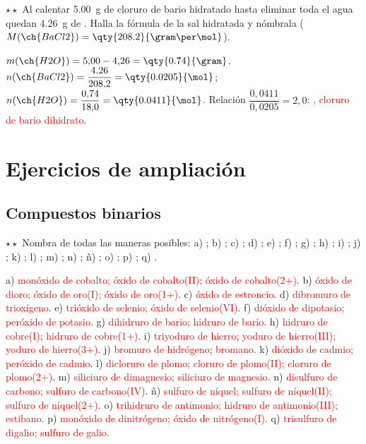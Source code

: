 \begin{exercise}
    \(\star\star\) Al calentar \qty{5.00}{\gram} de cloruro de bario hidratado hasta eliminar toda el agua quedan
    \qty{4.26}{\gram} de . Halla la fórmula de la sal hidratada y nómbrala (\(M(\ch{BaCl2}) = \qty{208.2}{\gram\per\mol}\)).
    \begin{solu}
        \(m(\ch{H2O}) = 5{,}00 - 4{,}26 = \qty{0.74}{\gram}\). \(n(\ch{BaCl2}) = \dfrac{4{,}26}{208{,}2} = \qty{0.0205}{\mol}\);
        \(n(\ch{H2O}) = \dfrac{0{,}74}{18{,}0} = \qty{0.0411}{\mol}\). Relación \(\dfrac{0{,}0411}{0{,}0205} = 2{,}0\):
        \textcolor{red}{, cloruro de bario dihidrato}.
    \end{solu}
\end{exercise}

\section{Ejercicios de ampliación}\label{sec:ud5-ampliacion}

\subsection{Compuestos binarios}

\begin{exercise}
    \(\star\star\) Nombra de todas las maneras posibles: a) ; b) ; c) ; d) ; e) ;
    f) ; g) ; h) ; i) ; j) ; k) ; l) ; m) ; n)
    ; ñ) ; o) ; p) ; q) .
    \begin{solu}
        a) \textcolor{red}{monóxido de cobalto; óxido de cobalto(II); óxido de cobalto(2+)}. b) \textcolor{red}{óxido de dioro;
        óxido de oro(I); óxido de oro(1+)}. c) \textcolor{red}{óxido de estroncio}. d) \textcolor{red}{dibromuro de trioxígeno}.
        e) \textcolor{red}{trióxido de selenio; óxido de selenio(VI)}. f) \textcolor{red}{dióxido de dipotasio; peróxido de
        potasio}. g) \textcolor{red}{dihidruro de bario; hidruro de bario}. h) \textcolor{red}{hidruro de cobre(I); hidruro de
        cobre(1+)}. i) \textcolor{red}{triyoduro de hierro; yoduro de hierro(III); yoduro de hierro(3+)}. j)
        \textcolor{red}{bromuro de hidrógeno; bromano}. k) \textcolor{red}{dióxido de cadmio; peróxido de cadmio}. l)
        \textcolor{red}{dicloruro de plomo; cloruro de plomo(II); cloruro de plomo(2+)}. m) \textcolor{red}{siliciuro de
        dimagnesio; siliciuro de magnesio}. n) \textcolor{red}{disulfuro de carbono; sulfuro de carbono(IV)}. ñ)
        \textcolor{red}{sulfuro de níquel; sulfuro de níquel(II); sulfuro de níquel(2+)}. o) \textcolor{red}{trihidruro de
        antimonio; hidruro de antimonio(III); estibano}. p) \textcolor{red}{monóxido de dinitrógeno; óxido de nitrógeno(I)}. q)
        \textcolor{red}{trisulfuro de digalio; sulfuro de galio}.
    \end{solu}
\end{exercise}

